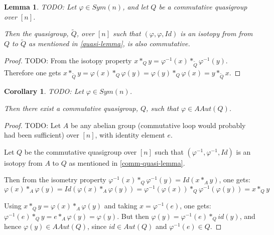 \documentclass[a4paper, 12pt, english]{article}
\theoremstyle{plain}
\newtheorem{corollary}[theorem]{Corollary}
\newtheorem{lemma}[theorem]{Lemma}
\theoremstyle{definition}
\begin{document}
\begin{lemma} \label{comm-quasi-lemma}
    TODO:
    Let \( \varphi \in Sym(n) \), and let \( Q \) be a commutative quasigroup over \( [n] \).

    Then the quasigroup, \( \tilde{Q} \), over \( [n] \) such that \( (\varphi, \varphi, Id) \) is an isotopy from from \( Q \) to \( \tilde{Q} \) as mentioned in \autoref{quasi-lemma}, is also commutative.
\end{lemma}
\begin{proof}
    TODO:
    From the isotopy property \( x *_Q y = \varphi^{-1}(x) *_{\tilde{Q}} \varphi^{-1}(y) \). 
    Therefore one gets \( x *_{\tilde{Q}} y = \varphi(x) *_Q \varphi(y) = \varphi(y) *_Q \varphi(x) = y *_{\tilde{Q}} x \). 
\end{proof}

\begin{corollary}
    TODO:
    Let \( \varphi \in Sym(n) \).

    Then there exist a commutative quasigroup, \( Q \), such that \( \varphi \in AAut(Q) \).
\end{corollary}
\begin{proof}
    TODO:
    Let \( A \) be any abelian group (commutative loop would probably had been sufficient) over \( [n] \), with identity element \( e \).

    Let \( Q \) be the commutative quasigroup over \( [n] \) such that \( (\varphi^{-1}, \varphi^{-1}, Id) \) is an isotopy from \( A \) to \( Q \) as mentioned in \autoref{comm-quasi-lemma}.
    
    Then from the isometry property \( \varphi^{-1}(x) *_Q \varphi^{-1}(y) = Id(x *_A y) \), one gets: 
    \[
        \varphi(x) *_A \varphi(y) = Id(\varphi(x) *_A \varphi(y)) = \varphi^{-1}(\varphi(x)) *_Q \varphi^{-1}(\varphi(y)) = x *_Q y 
    \]

    Using \( x *_Q y = \varphi(x) *_A \varphi(y) \) and taking \( x = \varphi^{-1}(e) \), one gets: \( \varphi^{-1}(e) *_Q y = e *_A \varphi(y) = \varphi(y) \). But then \( \varphi(y) = \varphi^{-1}(e) *_Q id(y) \), and hence \( \varphi(y) \in AAut(Q) \), since \( id \in Aut(Q) \) and \( \varphi^{-1}(e) \in Q \).
\end{proof}
\end{document}
